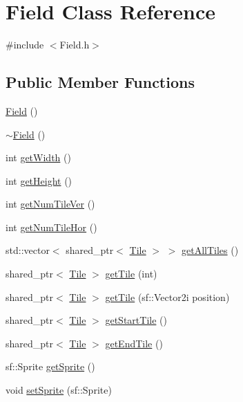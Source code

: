 \hypertarget{class_field}{\section{Field Class Reference}
\label{class_field}
}


{\ttfamily \#include $<$Field.\+h$>$}

\subsection*{Public Member Functions}
\begin{DoxyCompactItemize}
\item 
\hyperlink{class_field_a3e804c92273d9159f413f227b535c672}{Field} ()
\item 
\hyperlink{class_field_a45d6e6d09b8f8e46de62b40119d62c60}{$\sim$\+Field} ()
\item 
int \hyperlink{class_field_a53178ea9734894e60a5151d7e56d94e4}{get\+Width} ()
\item 
int \hyperlink{class_field_ac39db829e87a75308ea3e7f650c5b8aa}{get\+Height} ()
\item 
int \hyperlink{class_field_a80421e1b0847ecdffad0e30a1c5039cb}{get\+Num\+Tile\+Ver} ()
\item 
int \hyperlink{class_field_a4e81aea72d1792db4b7ae317d572f3f8}{get\+Num\+Tile\+Hor} ()
\item 
std\+::vector$<$ shared\+\_\+ptr$<$ \hyperlink{class_tile}{Tile} $>$ $>$ \hyperlink{class_field_a02d0f4d7a71d5db233296d0a1f2970b3}{get\+All\+Tiles} ()
\item 
shared\+\_\+ptr$<$ \hyperlink{class_tile}{Tile} $>$ \hyperlink{class_field_af7c4ae236b67f71dafa5af55e07d5a35}{get\+Tile} (int)
\item 
shared\+\_\+ptr$<$ \hyperlink{class_tile}{Tile} $>$ \hyperlink{class_field_aa02831bd4750269235141b881b7528c1}{get\+Tile} (sf\+::\+Vector2i position)
\item 
shared\+\_\+ptr$<$ \hyperlink{class_tile}{Tile} $>$ \hyperlink{class_field_ad745822d39abbe2c5ccbd4bd7cd480aa}{get\+Start\+Tile} ()
\item 
shared\+\_\+ptr$<$ \hyperlink{class_tile}{Tile} $>$ \hyperlink{class_field_aa38352e415a48f7c7554d1455ca6057b}{get\+End\+Tile} ()
\item 
sf\+::\+Sprite \hyperlink{class_field_aed6c614deb72c92b63c2d41d24cb74c2}{get\+Sprite} ()
\item 
void \hyperlink{class_field_accd424e7ead0ad4fb1bc20ee14832c90}{set\+Sprite} (sf\+::\+Sprite)
\item 

\end{DoxyCompactItemize}
